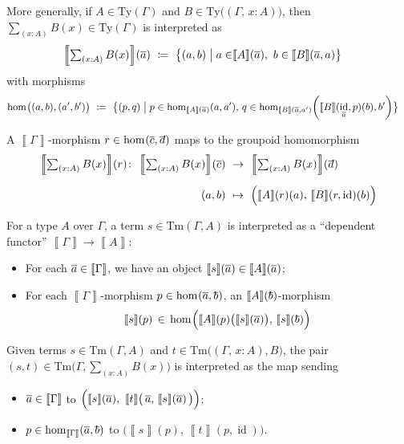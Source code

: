 \documentclass{article}
\theoremstyle{definition}
\renewcommand{\int}[1]{\mathopen{}\left\llbracket #1
    \right\rrbracket\mathclose{}}       %
\newcommand{\Sig}[2]{\textstyle\sum_{#1} #2}              %
\newcommand{\Ty}{\mathrm{Ty}}
\newcommand{\Tm}{\mathrm{Tm}}
\renewcommand{\hom}[3][]{\mathrm{hom}_{#1}\mathopen{}\left( #2, #3 \right)\mathclose{}}
\DeclareMathOperator{\id}{id}				    %
\newcommand{\defeq}{
	\mathrel{\mathrel{\mathop:}\mkern-1.2mu=}}	%
\newcommand{\tup}[1]{\overline{\smash{#1}\vphantom{a}}}
\newcommand{\n}{%
}                %
\begin{document}

More generally, if $A \in \Ty(\Gamma)$ and $B \in \Ty \big( (\Gamma,\, x:A) \big)$, then $\Sig{(x:A)}{B(x)}\in \Ty(\Gamma)$ is interpreted as
\begin{align*}
    \int{\Sig{(x:A)}{B(x)}}(\tup{a})\ \defeq\ \big\{ (a,b) \mathrel{\big|} a \in &\int{A}\n(\tup{a}),\ b \in \int{B}\n(\tup{a},a) \big\}
\end{align*}
with morphisms
\begin{align*}
    \hom%
    {\big.(a,b)}{(a',b')}\ \defeq\ \big\{ (p,q)& \mathrel{\big|} p \in \hom[\int{A}(\tup{a})]{a}{a'},\, q \in \hom[\int{B}(\tup{a},a')]{\big.\int{B}(\id_{\tup{a}},p)(b)}{b'} \big\}
\end{align*}

A $\int{\Gamma}$-morphism $r \in \hom%
{\tup{c}}{\tup{d}}$ maps to the groupoid homomorphism
\begin{align*}
    \int{\Sig{(x:A)}{B(x)}}(r)\colon\ \int{\Sig{(x:A)}{B(x)}}(\tup{c})\ &\to\ \int{\Sig{(x:A)}{B(x)}}(\tup{d}) \\[2mm]
    (a,b)\ &\mapsto\ \Big( \int{A}(r)(a),\, \int{B}(r,\id%
    )(b) \Big)
\end{align*}

{\color{orange}
For a type $A$ over $\Gamma$, a term $s \in \Tm(\Gamma,A)$ is interpreted as a ``dependent functor'' $\int{\Gamma} \to \int{A}$:
\begin{itemize}
    \item For each $\tup{a} \in \int{\Gamma}$, we have an object $\int{s}(\tup{a}) \in \int{A}(\tup{a})$;
    
    \item For each $\int{\Gamma}$-morphism $p \in \hom{\tup{a}}{\tup{b}}$, an $\int{A}(\tup{b})$-morphism $$\int{s}(p)\, \in\, \hom{\Big.\int{A}(p) \big( \int{s}(\tup{a}) \big)}{\,\int{s}(\tup{b})}$$
\end{itemize}
}

Given terms $s \in \Tm(\Gamma, A)$ and $t \in \Tm \big( (\Gamma,\, x:A), B \big)$, the pair $(s,t) \in \Tm\Big( \Gamma, \Sig{(x:A)}{B(x)} \Big)$ is interpreted as the map sending
\begin{itemize}
    \item $\tup{a} \in \int{\Gamma}$ to $\Big( \int{s}\n(\tup{a}),\ \int{t}\n\big(\, \tup{a},\,\int{s}\n(\tup{a}) \,\big) \Big)$;
    
    \item $p \in \hom[\int{\Gamma}]{\tup{a}}{\tup{b}}$ to $\Big( \int{s}(p),\, \int{t}(p,\id) \Big)$.
\end{itemize}
\end{document}
